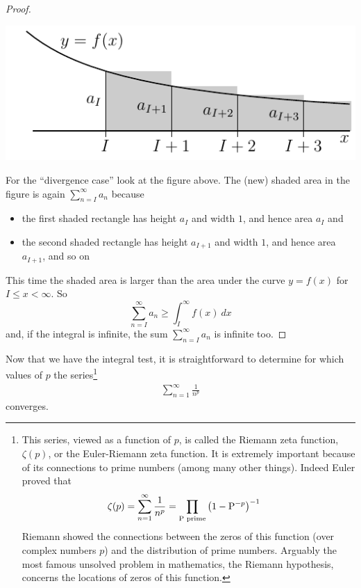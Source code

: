 \begin{proof}
\begin{efig}
\begin{center}
     \includegraphics{intTest4.pdf}
\end{center}
\end{efig}

For the ``divergence case'' look at the figure above.
The (new) shaded area in the figure is again $\sum_{n=I}^\infty a_n$
because
\begin{itemize}\itemsep1pt \parskip0pt  %
\item the first shaded rectangle has height $a_I$
and width $1$, and hence area $a_I$ and
\item the second shaded rectangle has height $a_{I+1}$
and width $1$, and hence area $a_{I+1}$, and so on
\end{itemize}
This time the shaded area is larger than the area under the curve
$y=f(x)$ for $I\le x<\infty$. So
\begin{equation*}
\sum_{n=I}^\infty a_n
\ge \int_I^\infty f(x)\ dx
\end{equation*}
and, if the integral is infinite, the sum $\sum_{n=I}^\infty a_n$ is infinite
too.


\end{proof}

Now that we have the integral test, it is straightforward to determine
for which values of $p$ the series\footnote{This series, viewed
as a function of $p$, is called the Riemann zeta function, $\zeta(p)$,
or the Euler-Riemann zeta function. It is extremely important because
of its connections to prime numbers (among many other things). Indeed
Euler proved that
\begin{align*}
\zeta(p) = \sum_{n=1}^\infty \frac{1}{n^p}
           &= \prod_{\text{P prime}} \left(1 - {\rm P}^{-p} \right)^{-1}
\end{align*}
Riemann showed the connections between the zeros of this function (over
complex numbers $p$) and the distribution of prime numbers. Arguably the
most famous unsolved problem in mathematics, the Riemann
hypothesis, concerns the locations of zeros of this function.
}
\begin{align*}
 \sum_{n=1}^\infty \frac{1}{n^p}
\end{align*}
converges.


